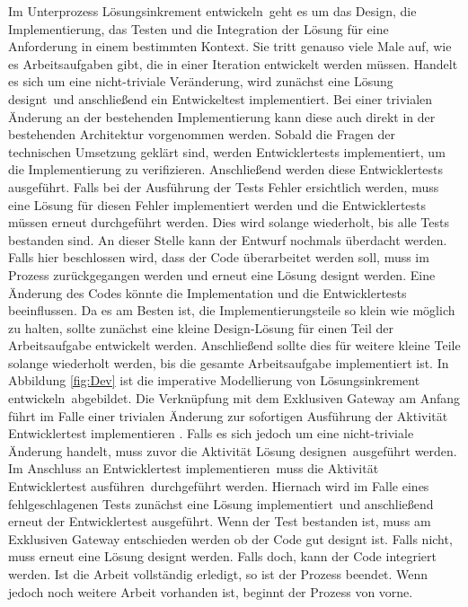 Im Unterprozess \grqq Lösungsinkrement entwickeln\grqq \ geht es um das Design, die Implementierung, das Testen und die Integration der Lösung für eine Anforderung in einem bestimmten Kontext. Sie tritt genauso viele Male auf, wie es Arbeitsaufgaben gibt, die in einer Iteration entwickelt werden müssen.
 Handelt es sich um eine nicht-triviale Veränderung, wird zunächst eine \grqq Lösung designt\grqq \ und anschließend ein \grqq Entwickeltest implementiert\grqq. Bei einer trivialen Änderung an der bestehenden Implementierung kann diese auch direkt in der bestehenden Architektur vorgenommen werden. \newline
 Sobald die Fragen der technischen Umsetzung geklärt sind, werden \grqq Entwicklertests implementiert\grqq, um die Implementierung zu verifizieren. Anschließend werden diese \grqq Entwicklertests ausgeführt\grqq.\newline
 Falls bei der Ausführung der Tests Fehler ersichtlich werden, muss eine Lösung für diesen Fehler implementiert werden und die Entwicklertests müssen erneut durchgeführt werden. Dies wird solange wiederholt, bis alle Tests bestanden sind.\newline
An dieser Stelle kann der Entwurf nochmals überdacht werden. Falls hier beschlossen wird, dass der Code überarbeitet werden soll, muss im Prozess zurückgegangen werden und erneut eine Lösung designt werden. Eine Änderung des Codes könnte die Implementation und die Entwicklertests beeinflussen.\newline
 Da es am Besten ist, die Implementierungsteile so klein wie möglich zu halten, sollte zunächst eine kleine Design-Lösung für einen Teil der Arbeitsaufgabe entwickelt werden. Anschließend sollte dies für weitere kleine Teile solange wiederholt werden, bis die gesamte Arbeitsaufgabe implementiert ist. \newline
 In Abbildung \ref{fig:Dev} ist die imperative Modellierung von \grqq Lösungsinkrement entwickeln\grqq \ abgebildet.\newline
 Die Verknüpfung mit dem Exklusiven Gateway am Anfang führt im Falle einer trivialen Änderung zur sofortigen Ausführung der Aktivität  \grqq Entwicklertest implementieren \grqq. Falls es sich jedoch um eine nicht-triviale Änderung handelt, muss zuvor die Aktivität \grqq Lösung designen\grqq \ ausgeführt werden. Im Anschluss an \grqq Entwicklertest implementieren\grqq \ muss die Aktivität \grqq Entwicklertest ausführen\grqq \ durchgeführt werden.\newline
 Hiernach wird im Falle eines fehlgeschlagenen Tests zunächst eine \grqq Lösung implementiert\grqq \ und anschließend erneut der \grqq Entwicklertest ausgeführt\grqq. \newline
 Wenn der Test bestanden ist, muss am Exklusiven Gateway entschieden werden ob der Code gut designt ist. Falls nicht, muss erneut eine Lösung designt werden. Falls doch, kann der Code integriert werden. Ist die Arbeit vollständig erledigt, so ist der Prozess beendet. Wenn jedoch noch weitere Arbeit vorhanden ist, beginnt der Prozess von vorne.
 
